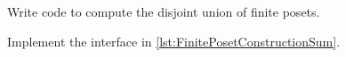 
\begin{codeexercise}
    Write code to compute the disjoint union of finite posets.

    Implement the interface in \cref{lst:FinitePosetConstructionSum}.
\end{codeexercise}



